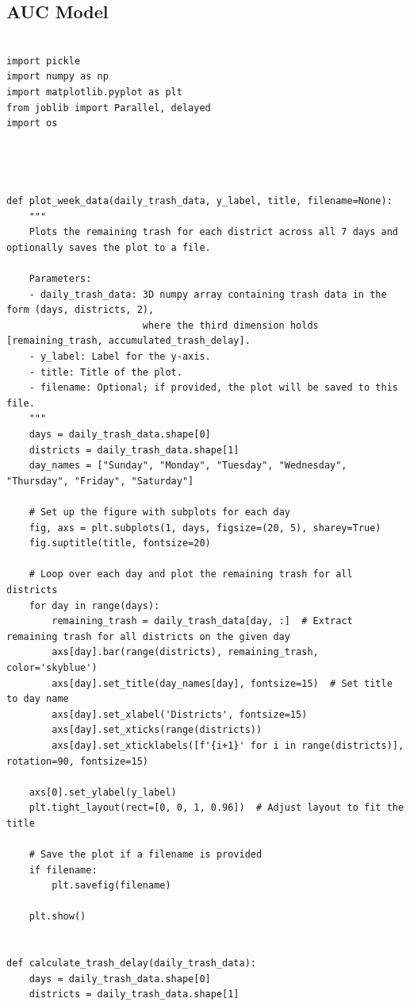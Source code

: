 \documentclass{article}
\begin{document}
\subsection{AUC Model}

\begin{verbatim}

import pickle
import numpy as np
import matplotlib.pyplot as plt
from joblib import Parallel, delayed
import os




def plot_week_data(daily_trash_data, y_label, title, filename=None):
    """
    Plots the remaining trash for each district across all 7 days and optionally saves the plot to a file.
    
    Parameters:
    - daily_trash_data: 3D numpy array containing trash data in the form (days, districts, 2),
                        where the third dimension holds [remaining_trash, accumulated_trash_delay].
    - y_label: Label for the y-axis.
    - title: Title of the plot.
    - filename: Optional; if provided, the plot will be saved to this file.
    """
    days = daily_trash_data.shape[0]
    districts = daily_trash_data.shape[1]
    day_names = ["Sunday", "Monday", "Tuesday", "Wednesday", "Thursday", "Friday", "Saturday"]
    
    # Set up the figure with subplots for each day
    fig, axs = plt.subplots(1, days, figsize=(20, 5), sharey=True)
    fig.suptitle(title, fontsize=20)
    
    # Loop over each day and plot the remaining trash for all districts
    for day in range(days):
        remaining_trash = daily_trash_data[day, :]  # Extract remaining trash for all districts on the given day
        axs[day].bar(range(districts), remaining_trash, color='skyblue')
        axs[day].set_title(day_names[day], fontsize=15)  # Set title to day name
        axs[day].set_xlabel('Districts', fontsize=15)
        axs[day].set_xticks(range(districts))
        axs[day].set_xticklabels([f'{i+1}' for i in range(districts)], rotation=90, fontsize=15)
    
    axs[0].set_ylabel(y_label)
    plt.tight_layout(rect=[0, 0, 1, 0.96])  # Adjust layout to fit the title

    # Save the plot if a filename is provided
    if filename:
        plt.savefig(filename)
    
    plt.show()


def calculate_trash_delay(daily_trash_data):
    days = daily_trash_data.shape[0]
    districts = daily_trash_data.shape[1]
    

\end{verbatim}
\end{document}
